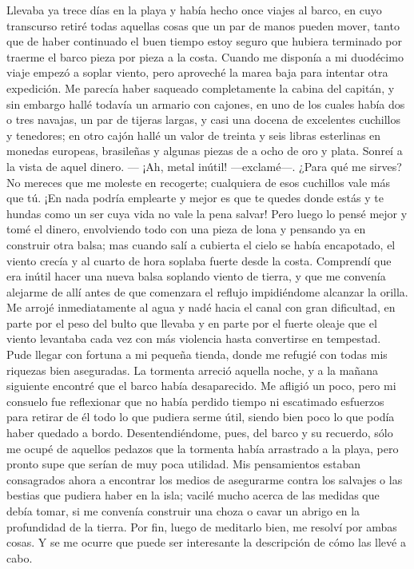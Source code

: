 \documentclass{novela}
\begin{document}
    Llevaba ya trece días en la playa y había hecho once viajes al barco, en cuyo transcurso retiré todas aquellas cosas que un par de manos pueden mover, tanto que de haber continuado el buen tiempo estoy seguro que hubiera terminado por traerme el barco pieza por pieza a la costa. Cuando me disponía a mi duodécimo viaje empezó a soplar viento, pero aproveché la marea baja para intentar otra expedición. Me parecía haber saqueado completamente la cabina del capitán, y sin embargo hallé todavía un armario con cajones, en uno de los cuales había dos o tres navajas, un par de tijeras largas, y casi una docena de excelentes cuchillos y tenedores; en otro cajón hallé un valor de treinta y seis libras esterlinas en monedas europeas, brasileñas y algunas piezas de a ocho de oro y plata. Sonreí a la vista de aquel dinero. — ¡Ah, metal inútil! —exclamé—. ¿Para qué me sirves? No mereces que me moleste en recogerte; cualquiera de esos cuchillos vale más que tú. ¡En nada podría emplearte y mejor es que te quedes donde estás y te hundas como un ser cuya vida no vale la pena salvar!
    Pero luego lo pensé mejor y tomé el dinero, envolviendo todo con una pieza de lona y pensando ya en construir otra balsa; mas cuando salí a cubierta el cielo se había encapotado, el viento crecía y al cuarto de hora soplaba fuerte desde la costa. Comprendí que era inútil hacer una nueva balsa soplando viento de tierra, y que me convenía alejarme de allí antes de que comenzara el reflujo impidiéndome alcanzar la orilla. Me arrojé inmediatamente al agua y nadé hacia el canal con gran dificultad, en parte por el peso del bulto que llevaba y en parte por el fuerte oleaje que el viento levantaba cada vez con más violencia hasta convertirse en tempestad.
    Pude llegar con fortuna a mi pequeña tienda, donde me refugié con todas mis riquezas bien aseguradas. La tormenta arreció aquella noche, y a la mañana siguiente encontré que el barco había desaparecido. Me afligió un poco, pero mi consuelo fue reflexionar que no había perdido tiempo ni escatimado esfuerzos para retirar de él todo lo que pudiera serme útil, siendo bien poco lo que podía haber quedado a bordo.
    Desentendiéndome, pues, del barco y su recuerdo, sólo me ocupé de aquellos pedazos que la tormenta había arrastrado a la playa, pero pronto supe que serían de muy poca utilidad. Mis pensamientos estaban consagrados ahora a encontrar los medios de asegurarme contra los salvajes o las bestias que pudiera haber en la isla; vacilé mucho acerca de las medidas que debía tomar, si me convenía construir una choza o cavar un abrigo en la profundidad de la tierra. Por fin, luego de meditarlo bien, me resolví por ambas cosas. Y se me ocurre que puede ser interesante la descripción de cómo las llevé a cabo.
\end{document}
